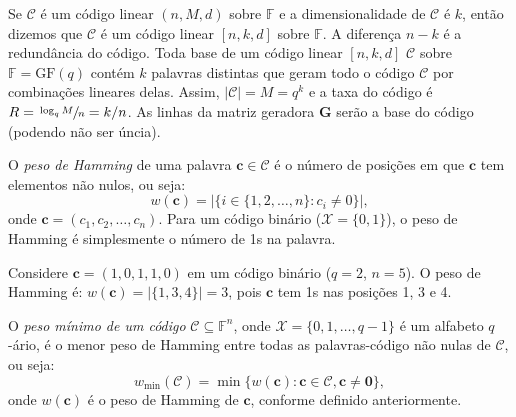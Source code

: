 Se $\mathcal{C}$ é um código linear $(n,M,d)$ sobre $\mathbb{F}$ e a dimensionalidade de $\mathcal{C}$ é $k$,
então dizemos que $\mathcal{C}$ é um código linear $[n,k,d]$ sobre $\mathbb{F}$. A diferença $n-k$ é a 
redundância do código. Toda base de um código linear $[n,k,d]$ $\mathcal{C}$ sobre $\mathbb{F} = \text{GF}(q)$
contém $k$ palavras distintas que geram todo o código $\mathcal{C}$ por combinações lineares delas.
Assim, $\vert\mathcal{C}\vert = M = q^k$ e a taxa do código é $R = \sfrac{\log_q M}{n} = k/n$.
As linhas da matriz geradora $\mathbf{G}$ serão a base do código (podendo não ser úncia).


\begin{definition}
O \emph{peso de Hamming} de uma palavra $\mathbf{c} \in \mathcal{C}$
é o número de posições em que $\mathbf{c}$ tem elementos não nulos, ou seja:
\begin{equation}
  w(\mathbf{c}) = |\{ i \in \{1, 2, \dots, n\} : c_i \neq 0 \}|,
\end{equation}
onde $\mathbf{c} = (c_1, c_2, \dots, c_n)$. 
Para um código binário ($\mathcal{X} = \{0, 1\}$), o peso de Hamming é simplesmente o número de 1s na palavra. 

\begin{example}
Considere $\mathbf{c} = (1, 0, 1, 1, 0)$ em um código binário ($q = 2$, $n = 5$). 
O peso de Hamming é: $w(\mathbf{c}) = |\{1, 3, 4\}| = 3$,
pois $\mathbf{c}$ tem 1s nas posições 1, 3 e 4.
\end{example}
\end{definition}

\begin{definition}
O \emph{peso mínimo de um código} $\mathcal{C} \subseteq \mathbb{F}^n$, 
onde $\mathcal{X} = \{0, 1, \dots, q-1\}$ é um alfabeto $q$-ário, 
é o menor peso de Hamming entre todas as palavras-código não nulas de $\mathcal{C}$, ou seja:
\begin{equation}
w_{\text{min}}(\mathcal{C}) = \min \{ w(\mathbf{c}) : \mathbf{c} \in \mathcal{C}, \mathbf{c} \neq \mathbf{0} \},
\end{equation}
onde $w(\mathbf{c})$ é o peso de Hamming de $\mathbf{c}$, 
conforme definido anteriormente. 
\end{definition}


